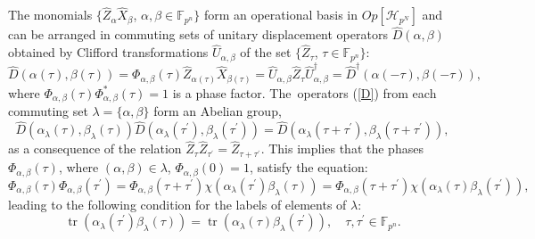 \documentclass[quantumrep,article,accept,pdftex,moreauthors]{Definitions/mdpi}
\DeclareMathOperator{\tr}{tr}
\begin{document}
The monomials $\{\hat{Z}_{\alpha}\hat{X}_{\beta}$, $\alpha,\beta \in
\mathbb{F}_{p^{n}}\}$ form an operational basis in $Op[\mathcal{H}_{p^{N}}]$ and
can be arranged in commuting sets of unitary displacement operators
$\hat{D}(\alpha,\beta)$ obtained by Clifford transformations
$\hat{U}_{\alpha,\beta}$ of the set $\{\hat{Z}_{\tau}$, $\tau \in
\mathbb{F}_{p^{n}}\}$:
\begin{equation}
  \hat{D} \left( \alpha(\tau),\beta(\tau) \right)
  = \Phi_{\alpha,\beta} \left( \tau \right)
  \hat{Z}_{\alpha(\tau)}\hat{X}_{\beta(\tau)}
  = \hat{U}_{\alpha,\beta}\hat{Z}_{\tau}\hat{U}_{\alpha,\beta}^{\dagger}
  = \hat{D}^{\dagger}\left(\alpha(-\tau),\beta(-\tau)\right),
  \label{D}
\end{equation}
where $\Phi_{\alpha,\beta}\left( \tau \right) \Phi_{\alpha,\beta}^{\ast}\left(
\tau \right)=1$ is a phase factor. The~operators (\ref{D}) from each commuting
set $\lambda=\{\alpha,\beta\}$ form an Abelian group,
\begin{equation}
  \hat{D}\left( \alpha_{\lambda}(\tau),\beta_{\lambda }(\tau) \right)
  \hat{D}\left(
    \alpha_{\lambda}(\tau^{\prime}),\beta_{\lambda}(\tau^{\prime})
  \right)
  = \hat{D}\left(
    \alpha_{\lambda}(\tau + \tau^{\prime}),
    \beta_{\lambda}(\tau + \tau^{\prime})
  \right),
  \label{DD}
\end{equation}
as a consequence of the relation $\hat{Z}_{\tau}\hat{Z}_{\tau^{\prime}} =
\hat{Z}_{\tau+\tau^{\prime}}$. This implies that the phases
$\Phi_{\alpha,\beta}\left( \tau \right)$, where $(\alpha ,\beta )\in \lambda$,
$\Phi_{\alpha,\beta}\left(0\right) = 1$, satisfy the equation:
\begin{equation}
  \Phi_{\alpha,\beta}\left( \tau \right)
  \Phi_{\alpha,\beta }\left(\tau^{\prime}\right)
  = \Phi_{\alpha,\beta}\left( \tau+\tau^{\prime} \right)
  \chi\left( \alpha_{\lambda}(\tau^{\prime})\beta_{\lambda}(\tau) \right)
  = \Phi_{\alpha,\beta}\left(\tau+\tau^{\prime}\right)
  \chi\left(\alpha_{\lambda}(\tau)\beta_{\lambda}(\tau^{\prime })\right),
  \label{Phi}
\end{equation}
leading to the following condition for the labels of elements of $\lambda$:
\begin{equation}
  \tr\left(\alpha_{\lambda}(\tau^{\prime})\beta_{\lambda }(\tau)\right)
  = \tr\left(\alpha_{\lambda}(\tau)\beta_{\lambda}(\tau^{\prime})\right),
  \quad \tau,\tau^{\prime} \in \mathbb{F}_{p^{n}}.
  \label{CC}
\end{equation}
\end{document}

